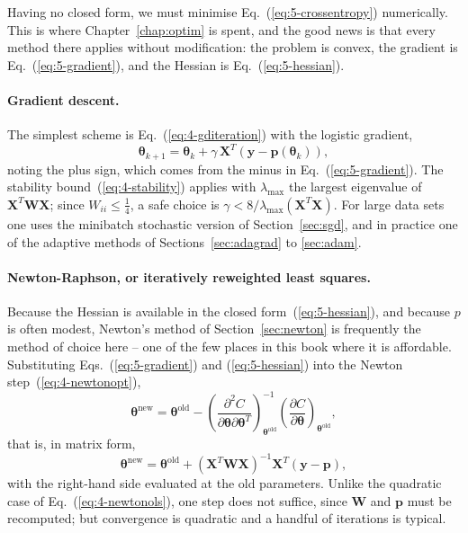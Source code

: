 Having no closed form, we must minimise Eq.~(\ref{eq:5-crossentropy})
numerically.  This is where Chapter~\ref{chap:optim} is spent, and the good
news is that every method there applies without modification: the problem is
convex, the gradient is Eq.~(\ref{eq:5-gradient}), and the Hessian is
Eq.~(\ref{eq:5-hessian}).

\paragraph{Gradient descent.}
The simplest scheme is Eq.~(\ref{eq:4-gditeration}) with the logistic
gradient,
\begin{equation}
  \bm{\theta}_{k+1} = \bm{\theta}_k
    + \gamma\,\bm{X}^{T}\left(\bm{y}-\bm{p}(\bm{\theta}_k)\right),
  \label{eq:5-gd}
\end{equation}
noting the plus sign, which comes from the minus in
Eq.~(\ref{eq:5-gradient}).  The stability
bound~(\ref{eq:4-stability}) applies with $\lambda_{\max}$ the largest
eigenvalue of $\bm{X}^{T}\bm{W}\bm{X}$; since $W_{ii}\le\tfrac14$, a safe
choice is $\gamma<8/\lambda_{\max}(\bm{X}^{T}\bm{X})$.  For large data sets one
uses the minibatch stochastic version of Section~\ref{sec:sgd}, and in
practice one of the adaptive methods of Sections~\ref{sec:adagrad} to
\ref{sec:adam}.

\paragraph{Newton-Raphson, or iteratively reweighted least squares.}
Because the Hessian is available in the closed
form~(\ref{eq:5-hessian}), and because $p$ is often modest, Newton's method of
Section~\ref{sec:newton} is frequently the method of choice here -- one of the
few places in this book where it is affordable.  Substituting
Eqs.~(\ref{eq:5-gradient}) and (\ref{eq:5-hessian}) into the Newton
step~(\ref{eq:4-newtonopt}),
\begin{equation}
  \bm{\theta}^{\mathrm{new}} = \bm{\theta}^{\mathrm{old}}
   - \left(\frac{\partial^{2}C}
      {\partial\bm{\theta}\partial\bm{\theta}^{T}}\right)^{-1}_{\bm{\theta}^{\mathrm{old}}}
     \left(\frac{\partial C}{\partial\bm{\theta}}\right)_{\bm{\theta}^{\mathrm{old}}},
  \label{eq:5-newtonabstract}
\end{equation}
that is, in matrix form,
\begin{equation}
  \boxed{\;
  \bm{\theta}^{\mathrm{new}} = \bm{\theta}^{\mathrm{old}}
   + \left(\bm{X}^{T}\bm{W}\bm{X}\right)^{-1}
     \bm{X}^{T}\left(\bm{y}-\bm{p}\right), \;}
  \label{eq:5-newton}
\end{equation}
with the right-hand side evaluated at the old parameters.  Unlike the
quadratic case of Eq.~(\ref{eq:4-newtonols}), one step does not suffice, since
$\bm{W}$ and $\bm{p}$ must be recomputed; but convergence is quadratic and a
handful of iterations is typical.

